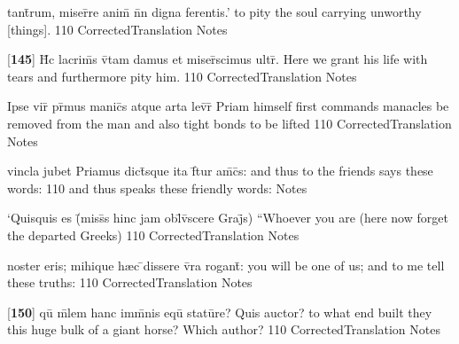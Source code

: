 \latline
  {tant\={}rum, miser\={}re anim\={\macron {\i}} n\={}n digna ferentis.'}
  { to pity the soul carrying unworthy [things]. }
  {110}
  { CorrectedTranslation }
  { Notes }


\latline
  {[\textbf{145}] H\={\macron {\i}}c lacrim\={\macron {\i}}s v\={\macron {\i}}tam damus et miser\={}scimus ultr\={}.}
  { Here we grant his life with tears and furthermore pity him. }
  {110}
  { CorrectedTranslation }
  { Notes }


\latline
  {Ipse vir\={} pr\={\macron {\i}}mus manic\={}s atque arta lev\={}r\={\macron {\i}}}
  { Priam himself first commands manacles be removed from the man and also tight bonds to be lifted }
  {110}
  { CorrectedTranslation }
  { Notes }


\latline
  {vincla jubet Priamus dict\={\macron {\i}}sque ita f\={}tur am\={\macron {\i}}c\={\macron {\i}}s:}
  { and thus to the friends says these words: }
  {110}
  { and thus speaks these friendly words: }
  { Notes }


\latline
  {`Quisquis es (\={}miss\={}s hinc jam obl\={\macron {\i}}v\={\macron {\i}}scere Graj\={}s)}
  { ``Whoever you are (here now forget the departed Greeks)}
  {110}
  { CorrectedTranslation }
  { Notes }


\latline
  {noster eris; mihique h{\ae}c \={}dissere v\={}ra rogant\={\macron {\i}}:}
  { you will be one of us; and to me tell these truths:  }
  {110}
  { CorrectedTranslation }
  { Notes }


\latline
  {[\textbf{150}] qu\={} m\={}lem hanc imm\={}nis equ\={\macron {\i}} statu\={}re?  Quis auctor?}
  { to what end built they this huge bulk of a giant horse?  Which author? }
  {110}
  { CorrectedTranslation }
  { Notes }


